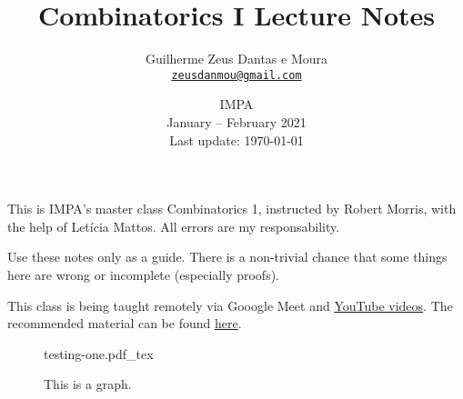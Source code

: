 \documentclass[a4paper, 10pt]{article}
\title{\sffamily \bfseries Combinatorics I Lecture Notes}
\author{\sc Guilherme Zeus Dantas e Moura\\\href{mailto:zeusdanmou@gmail.com}{\texttt{zeusdanmou@gmail.com}}}
\date{IMPA\\[3pt] January -- February 2021\\[3pt] Last update: \today}
\newcommand{\incfig}[2][1]{%
    \def\svgwidth{#1\columnwidth}
    {#2.pdf_tex}
}
\begin{document}
    \maketitle
	\sloppy
	
		This is IMPA's master class Combinatorics 1, instructed by Robert Morris, with the help of Letícia Mattos.
		All errors are my responsability.

		Use these notes only as a guide. There is a non-trivial chance that some things here are wrong or incomplete (especially proofs).

		This class is being taught remotely via Gooogle Meet and \href{https://www.youtube.com/playlist?list=PLo4jXE-LdDTSkmHd3xNGhcObfWXvpwmCL}{YouTube videos}. The recommended material can be found \href{https://impa.br/wp-content/uploads/2017/04/28CBM_04.pdf}{here}.

		\hfill

		\begin{figure}[h]
			\centering
			\incfig[.8]{testing-one}
			\caption{This is a graph.}
			\label{fig:testing-one}
		\end{figure}

		\hfill

	\newpage
	\tableofcontents

	\newpage
    
    
    
    
    
    
    
    
    
    
\end{document}
